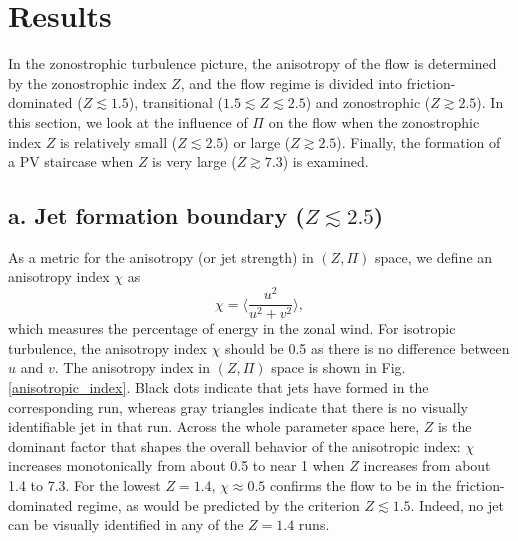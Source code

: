 \documentclass{jfm}
\begin{document}
\section{Results}

In the zonostrophic turbulence picture, the anisotropy of the flow is
determined by the zonostrophic index $Z$, and the flow regime is
divided into friction-dominated ($Z\apprle1.5$), transitional ($1.5\apprle Z\apprle2.5$)
and zonostrophic ($Z\apprge2.5$). In this section, we look at the
influence of $\Pi$ on the flow when the zonostrophic index $Z$ is
relatively small ($Z\apprle2.5$) or large ($Z\apprge2.5$). Finally,
the formation of a PV staircase when $Z$ is very large ($Z\apprge7.3$)
is examined.

\subsection*{a. Jet formation boundary ($Z\apprle2.5$)}

As a metric for the anisotropy (or jet strength)
in $(Z,\Pi)$ space, we define an anisotropy index $\chi$ as
\begin{equation}
\chi=\langle\frac{u^{2}}{u^{2}+v^{2}}\rangle,
\end{equation}
which measures the percentage of energy in the zonal wind. For
isotropic turbulence, the anisotropy index $\chi$ should be 0.5
as there is no difference between $u$ and $v$. The anisotropy index
in $(Z,\Pi)$ space is shown in Fig. \ref{anisotropic_index}.
Black dots indicate that jets have formed in the corresponding run,
whereas gray triangles indicate that there is no visually identifiable
jet in that run. Across the whole parameter space here, $Z$ is the
dominant factor that shapes the overall behavior of the anisotropic
index: $\chi$ increases monotonically from about 0.5 to near 1 when
$Z$ increases from about 1.4 to 7.3. For the lowest $Z=1.4$, $\chi\approx0.5$
confirms the flow to be in the friction-dominated regime, as would
be predicted by the criterion $Z\apprle1.5$. Indeed, no jet can be visually identified in any 
of the $Z=1.4$ runs. %
\end{document}
